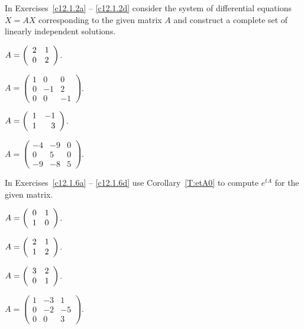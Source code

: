 \documentclass{ximera}
\begin{document}
\noindent  In Exercises~\ref{c12.1.2a} -- \ref{c12.1.2d} consider the system 
of differential equations $\dot X = AX$ corresponding to the given matrix 
$A$ and construct a complete set of linearly independent solutions.
\begin{exercise} \label{c12.1.2a}
$A=\left(\begin{array}{rr} 2 & 1\\ 0 &2\end{array}\right)$.
\end{exercise}
\begin{exercise} \label{c12.1.2b}
$A=\left(\begin{array}{rrr} 1 & 0 & 0\\ 0 & -1 & 2 \\ 0 & 0 & -1
\end{array}\right)$.
\end{exercise}
\begin{exercise} \label{c12.1.2c}
$A=\left(\begin{array}{rr} 1 & -1\\ 1 &3\end{array}\right)$.
\end{exercise}
\begin{exercise} \label{c12.1.2d}
$A=\left(\begin{array}{rrr} -4 & -9 & 0\\ 0 & 5 & 0 \\ -9 & -8 & 5
\end{array}\right)$.
\end{exercise}

\noindent  In Exercises~\ref{c12.1.6a} -- \ref{c12.1.6d} use Corollary~\ref{T:etA0} to compute $e^{tA}$ for the given matrix.
\begin{exercise} \label{c12.1.6a}
$A = \left(\begin{array}{rr} 0 & 1\\ 1 &0\end{array}\right)$.
\end{exercise}
\begin{exercise} \label{c12.1.6b}
$A = \left(\begin{array}{rr} 2 & 1\\ 1 &2\end{array}\right)$.
\end{exercise}
\begin{exercise} \label{c12.1.6c}
$A = \left(\begin{array}{rr} 3 & 2\\ 0 &1\end{array}\right)$.
\end{exercise}
\begin{exercise} \label{c12.1.6d}
$A = \left(\begin{array}{rrr} 1 & -3 & 1\\ 0 & -2 & -5 \\ 0 & 0 & 3
\end{array}\right)$.
\end{exercise}


\CEXER
\end{document}
